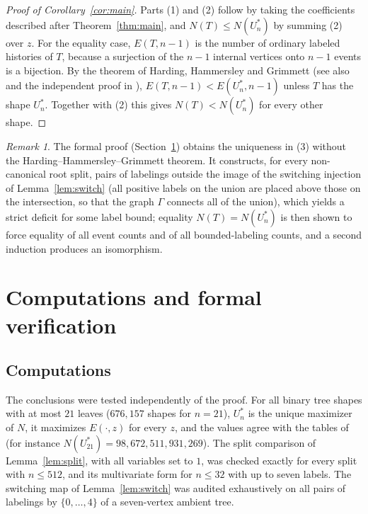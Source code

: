 \documentclass[11pt]{amsart}
\theoremstyle{definition}
\theoremstyle{remark}
\newtheorem{remark}[theorem]{Remark}
\begin{document}
\begin{proof}[Proof of Corollary~\ref{cor:main}]
Parts (1) and (2) follow by taking the coefficients described after Theorem~\ref{thm:main}, and $N(T)\le N(U^*_n)$ by summing (2) over $z$.
For the equality case, $E(T,n-1)$ is the number of ordinary labeled histories of $T$, because a surjection of the $n-1$ internal vertices onto $n-1$ events is a bijection.
By the theorem of Harding, Hammersley and Grimmett \cite{Harding,HG} (see also \cite[Theorem~7]{DR2026} and the independent proof in \cite{DR2026b}), $E(T,n-1)<E(U^*_n,n-1)$ unless $T$ has the shape $U^*_n$.
Together with (2) this gives $N(T)<N(U^*_n)$ for every other shape.
\end{proof}

\begin{remark}
The formal proof (Section~\ref{sec:lean}) obtains the uniqueness in (3) without the Harding--Hammersley--Grimmett theorem.
It constructs, for every non-canonical root split, pairs of labelings outside the image of the switching injection of Lemma~\ref{lem:switch} (all positive labels on the union are placed above those on the intersection, so that the graph $\Gamma$ connects all of the union), which yields a strict deficit for some label bound; equality $N(T)=N(U^*_n)$ is then shown to force equality of all event counts and of all bounded-labeling counts, and a second induction produces an isomorphism.
\end{remark}

\section{Computations and formal verification}\label{sec:lean}

\subsection*{Computations}
The conclusions were tested independently of the proof.
For all binary tree shapes with at most $21$ leaves ($676{,}157$ shapes for $n=21$), $U^*_n$ is the unique maximizer of $N$, it maximizes $E(\cdot,z)$ for every $z$, and the values agree with the tables of \cite{DR2026} (for instance $N(U^*_{21})=98{,}672{,}511{,}931{,}269$).
The split comparison of Lemma~\ref{lem:split}, with all variables set to $1$, was checked exactly for every split with $n\le 512$, and its multivariate form for $n\le 32$ with up to seven labels.
The switching map of Lemma~\ref{lem:switch} was audited exhaustively on all pairs of labelings by $\{0,\dots,4\}$ of a seven-vertex ambient tree.
\end{document}
